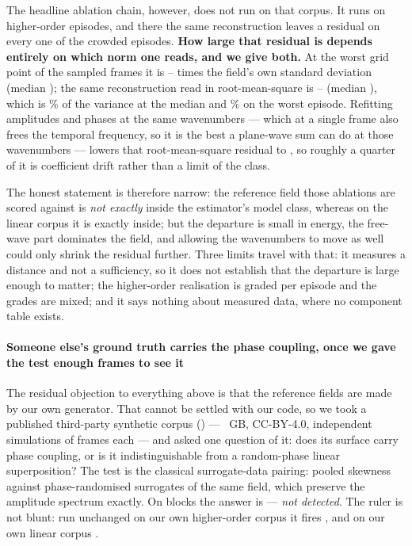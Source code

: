 \documentclass[review]{elsarticle}
\begin{document}
The headline ablation chain, however, does not run on that corpus. It runs on
higher-order episodes, and there the same reconstruction leaves a residual on every one
of the \COneCrowdedN{} crowded episodes. \textbf{How large that residual is depends
entirely on which norm one reads, and we give both.} At the worst grid point of the
sampled frames it is \COneCrowdedMin{}--\COneCrowdedMax{} times the field's own standard
deviation (median \COneCrowdedMed{}); the same reconstruction read in root-mean-square
is \COneCStoredMin{}--\COneCStoredMax{} (median \COneCStoredMed{}), which is
\COneCStoredVarPct{}\% of the variance at the median and
\COneCStoredVarWorstPct{}\% on the worst episode. Refitting amplitudes and phases at the
same wavenumbers --- which at a single frame also frees the temporal frequency, so it is
the best a plane-wave sum can do at those wavenumbers --- lowers that root-mean-square
residual to \COneCRmsMed{}, so roughly a quarter of it is coefficient drift rather than a
limit of the class.

The honest statement is therefore narrow: the reference field those ablations are scored
against is \emph{not exactly} inside the estimator's model class, whereas on the linear
corpus it is exactly inside; but the departure is small in energy, the free-wave part
dominates the field, and allowing the wavenumbers to move as well could only shrink the
residual further. Three limits travel with that: it measures a distance and not a
sufficiency, so it does not establish that the departure is large enough to matter; the
higher-order realisation is graded per episode and the grades are mixed; and it says
nothing about measured data, where no component table exists.

\paragraph{Someone else's ground truth carries the phase coupling, once we gave the
test enough frames to see it} The residual objection to everything above is that the reference fields
are made by our own generator. That cannot be settled with our code, so we took a
published third-party synthetic corpus (\TOneCite{}) --- \TOneGB{}~GB, CC-BY-4.0,
\TOneNMat{} independent simulations of \TOneFrames{} frames each --- and asked one
question of it: does its surface carry phase coupling, or is it indistinguishable
from a random-phase linear superposition? The test is the classical surrogate-data
pairing: pooled skewness against \TOneNSur{} phase-randomised surrogates of the same
field, which preserve the amplitude spectrum exactly. On \TOneN{} blocks the answer
is \TOneWin{} --- \emph{not detected}. The ruler is not blunt: run unchanged on our
own higher-order corpus it fires \TOnePos{}, and on our own linear corpus
\TOneNeg{}.
\end{document}
